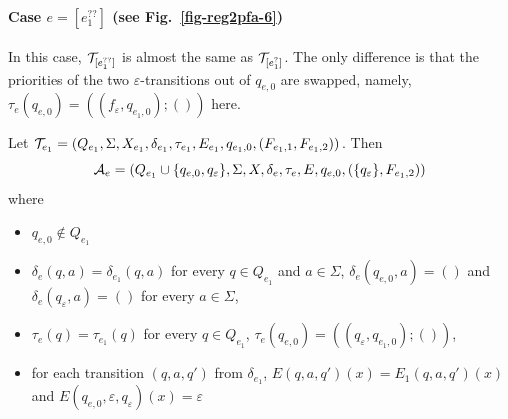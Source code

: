 \paragraph{Case $e = [e_1^{??}]$ (see Fig.~\ref{fig-reg2pfa-6})}  In this case, $\mathcal{T}_{[e_1^{??}]}$ is  almost the same as $\mathcal{T}_{[e_1^{?}]}$. The only difference is that the priorities of the two $\varepsilon$-transitions out of $q_{e,0}$ are swapped, namely, $\tau_e(q_{e,0}) = ((f_{\varepsilon}, q_{e_1,0}); ())$ here.
\OMIT
{
Let $\mathcal{T}_{e_1} = (Q_{e_1},
		\Sigma, X_{e_1}, \delta_{e_1}, \tau_{e_1}, E_{e_1} , q_{e_1,0}, (F_{e_1,1}, F_{e_1,2}))$. 
Then 
\[\mathcal{A}_e = (Q_{e_1} \cup \{q_{e,0}, q_{\varepsilon}\}, \Sigma, X, 
		\delta_e, \tau_e, E, q_{e,0}, (\{q_{\varepsilon}\}, F_{e_1,2}))\] 
where 
		\begin{itemize}
			\item $q_{e,0}  \not \in Q_{e_1}$
			\item $\delta_e(q, a) = \delta_{e_1}(q, a)$ for every $q \in Q_{e_1}$ and $a \in \Sigma$, $\delta_e(q_{e,0}, a)  = ()$ and $\delta_e(q_{\varepsilon}, a) = ()$ for every $a \in \Sigma$, 
			\item $\tau_e(q) = \tau_{e_1}(q)$ for every $q \in Q_{e_1}$, $\tau_e(q_{e,0}) = ((q_{\varepsilon}, q_{e_1,0}); ())$,
			
			\item for each transition $(q, a, q')$ from $\delta_{e_1}$, $E(q,a,q')(x) = E_1(q,a,q')(x)$ and $E(q_{e,0},\varepsilon,q_{\varepsilon})(x) =\varepsilon$
		\end{itemize}
}

